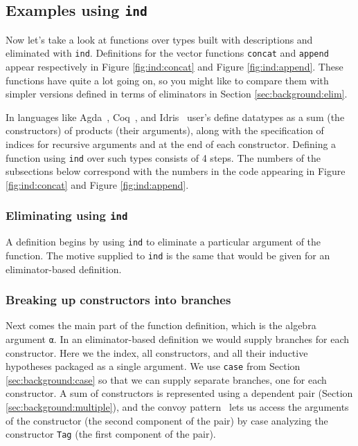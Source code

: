 \documentclass[preprint,nonatbib]{sigplanconf}
\begin{document}
\subsection{Examples using {\tt ind}}

Now let's take a look at functions over types built with descriptions
and eliminated with {\tt ind}. Definitions for the vector functions
{\tt concat} and {\tt append} appear respectively in
Figure \ref{fig:ind:concat} and Figure \ref{fig:ind:append}. These
functions have quite a lot going on, so you might like to compare them with
simpler versions defined in terms of eliminators in
Section \ref{sec:background:elim}.

In languages like
{\sc Agda}~\citep{norell2007towards},
{\sc Coq}~\citep{coq08}, and
{\sc Idris}~\citep{brady2011idris} user's define
datatypes as a sum (the constructors) of products (their arguments),
along with the specification of indices for recursive arguments and at
the end of each constructor. Defining a function using {\tt ind} over
such types consists of 4 steps. The numbers of the subsections below
correspond with the numbers in
the code appearing in Figure \ref{fig:ind:concat} and
Figure \ref{fig:ind:append}.

\subsubsection{Eliminating using {\tt ind}}
A definition begins by using {\tt ind} to eliminate a particular
argument of the function. The motive supplied to {\tt ind} is the same
that would be given for an eliminator-based definition.

\subsubsection{Breaking up constructors into branches}
Next comes the main part of the function definition, which is the
algebra argument {\tt α}. In an eliminator-based definition we would
supply branches for each constructor. Here we the index, all
constructors, and all their inductive hypotheses packaged as a single
argument. We use {\tt case} from Section
\ref{sec:background:case} so that we can supply separate branches, one
for each constructor. A sum of constructors is represented
using a dependent pair (Section
\ref{sec:background:multiple}), and the convoy
pattern~\citep{TODO} lets us access the arguments of the constructor
(the second component of the pair) by case analyzing the
constructor {\tt Tag} (the first component of the pair).
\end{document}
